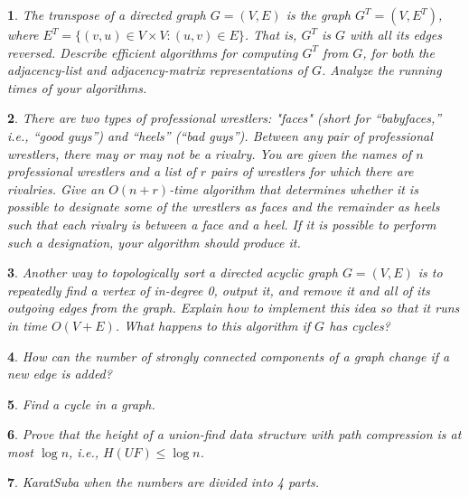 \documentclass[%
addpoints]{exam}
\theoremstyle{problem}
\newtheorem{p}{}
\begin{document}
\begin{p} 
The \textit{transpose} of a directed graph \( G = (V, E) \) is the graph \( G^T = (V, E^T) \), where \( E^T = \{(v, u) \in V \times V : (u, v) \in E\} \). That is, \( G^T \) is \( G \) with all its edges reversed.  
Describe efficient algorithms for computing \( G^T \) from \( G \), for both the adjacency-list and adjacency-matrix representations of \( G \). Analyze the running times of your algorithms.  
\hfill  
\end{p}

\begin{p} 
There are two types of professional wrestlers: "faces" (short for “babyfaces,” i.e., “good guys”) and “heels” (“bad guys”). Between any pair of professional wrestlers, there may or may not be a rivalry. You are given the names of \( n \) professional wrestlers and a list of \( r \) pairs of wrestlers for which there are rivalries. Give an \( O(n + r) \)-time algorithm that determines whether it is possible to designate some of the wrestlers as faces and the remainder as heels such that each rivalry is between a face and a heel. If it is possible to perform such a designation, your algorithm should produce it.  
\hfill  
\end{p}

\begin{p} 
Another way to topologically sort a directed acyclic graph \( G = (V, E) \) is to repeatedly find a vertex of in-degree 0, output it, and remove it and all of its outgoing edges from the graph. Explain how to implement this idea so that it runs in time \( O(V + E) \). What happens to this algorithm if \( G \) has cycles?  
\hfill  
\end{p}

\begin{p} 
How can the number of strongly connected components of a graph change if a new edge is added?  
\hfill  
\end{p}

\begin{p}
Find a cycle in a graph.  
\hfill
\end{p}

\begin{p}
Prove that the height of a union-find data structure with path compression is at most $\log n$, i.e., $H(UF) \leq \log n$.  
\hfill
\end{p}

\begin{p}
KaratSuba when the numbers are divided into 4 parts.
\hfill\end{p}
\end{document}
